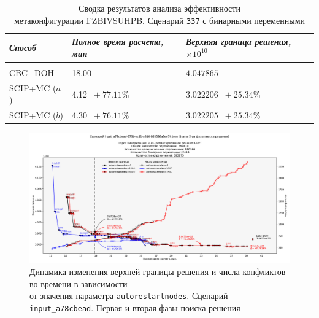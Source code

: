 \documentclass[%
	11pt,
	a4paper,
	utf8,
		]{article}
\begin{document}
{
	\begin{table}[!h]
		\centering
		\caption{Сводка результатов анализа эффективности\\метаконфигурации FZBIVSUHPB. Сценарий \texttt{337} с бинарными переменными}
		\begin{tabular}{ p{2.5cm} p{3.3cm} p{3.4cm} }
			\emph{Способ} & \emph{Полное время расчета, мин} & \emph{Верхняя граница решения, $ \times 10^{10} $} \\
			\hline\hline\\[-3.5mm]
			{CBC+DOH} & 18.00 & $ 4.047865 $ \\
			\hline
			SCIP+MC ($ a $) & 4.12 {\color{blue} $\ +77.11 $\%} & $ 3.022206 $ {\color{blue} $\ +25.34 $\%} \\
			\hline
			SCIP+MC ($ b $) &  4.30 {\color{blue} $\ +76.11 $\%} & $ 3.022205 $ {\color{blue} $\ +25.34 $\%} \\
		\end{tabular}\label{tab:337}
	\end{table}







	\begin{figure}[!h]
		\centering
		\includegraphics[scale=0.42]{figures/a78cbead_autorestartnodes_1_2_phase.pdf}
		\caption{ Динамика изменения верхней границы решения и числа конфликтов во времени в зависимости \\от значения параметра \texttt{autorestartnodes}. Сценарий \texttt{input\_a78cbead}. Первая и вторая фазы поиска решения }\label{fig:a78cbead_autorestartnodes_1_2_phase}
	\end{figure}

}
\end{document}
